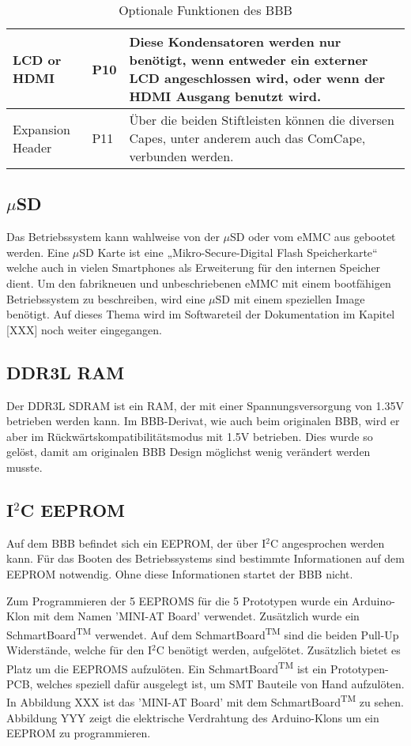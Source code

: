 \begin{table}
\begin{tabular}{ | p{2.5cm} | l | p{9.5cm} |}
    LCD or HDMI				& P10		& Diese Kondensatoren werden nur benötigt, wenn entweder ein externer LCD angeschlossen wird, oder wenn der HDMI Ausgang benutzt wird.\\ \hline 
    
    Expansion Header& P11		& Über die beiden Stiftleisten können die diversen Capes, unter anderem auch das ComCape, verbunden werden.\\ \hline 

    \end{tabular}
	\caption{Optionale Funktionen des BBB}
	\label{tab:optionaleFunktionen}
\end{table}


\subsection{$\mu$SD}
Das Betriebssystem kann wahlweise von der $\mu$SD oder vom eMMC aus gebootet werden. Eine $\mu$SD Karte ist eine „Mikro-Secure-Digital Flash Speicherkarte“ welche auch in vielen Smartphones als Erweiterung für den internen Speicher dient. Um den fabrikneuen und unbeschriebenen eMMC mit einem bootfähigen Betriebssystem zu beschreiben, wird eine $\mu$SD mit einem speziellen Image benötigt. Auf dieses Thema wird im Softwareteil der Dokumentation im Kapitel [XXX] noch weiter eingegangen.


\subsection{DDR3L RAM}
Der DDR3L SDRAM ist ein RAM, der mit einer Spannungsversorgung von 1.35V betrieben werden kann. Im BBB-Derivat, wie auch beim originalen BBB, wird er aber im Rückwärtskompatibilitätsmodus  mit 1.5V betrieben. Dies wurde so gelöst, damit am originalen BBB Design möglichst wenig verändert werden musste.


\subsection{I$^2$C EEPROM}
Auf dem BBB befindet sich ein EEPROM, der über I$^2$C angesprochen werden kann. Für das Booten des Betriebssystems sind bestimmte Informationen auf dem EEPROM notwendig. Ohne diese Informationen startet der BBB nicht.

Zum Programmieren der 5 EEPROMS für die 5 Prototypen wurde ein Arduino-Klon mit dem Namen 'MINI-AT Board' verwendet. Zusätzlich wurde ein SchmartBoard\textsuperscript{TM} verwendet. Auf dem SchmartBoard\textsuperscript{TM} sind die beiden Pull-Up Widerstände, welche für den I$^2$C benötigt werden, aufgelötet. Zusätzlich bietet es Platz um die EEPROMS aufzulöten. Ein SchmartBoard\textsuperscript{TM} ist ein Prototypen-PCB, welches speziell dafür ausgelegt ist, um SMT Bauteile von Hand aufzulöten. In Abbildung XXX ist das 'MINI-AT Board' mit dem SchmartBoard\textsuperscript{TM} zu sehen. Abbildung YYY zeigt die elektrische Verdrahtung des Arduino-Klons um ein EEPROM zu programmieren.

